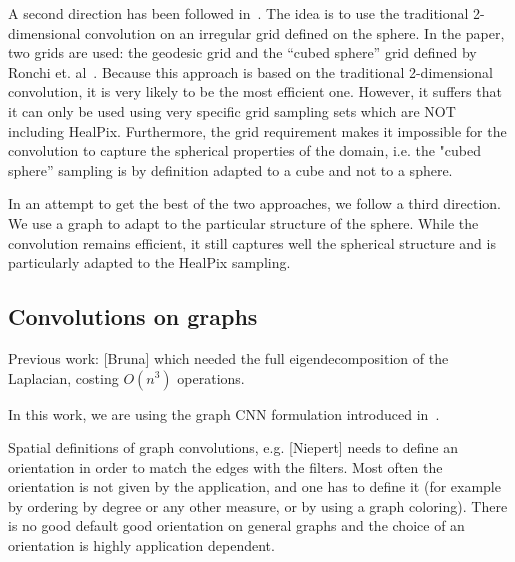\documentclass[preprint,12pt,authoryear]{elsarticle}
\newcommand{\nati}[1]{{\color[rgb]{.1,.6,.1}{#1}}}
\newcommand{\todo}[1]{{\color[rgb]{.6,.1,.6}{#1}}}
\newcommand{\assign}[1]{{\color[rgb]{.8,.5,.8}{Assigned: #1 }}}
\newcommand{\1}{\b{1}}              %
\newcommand{\0}{\b{0}}              %
\begin{document}
A second direction has been followed in~\cite{boomsma2017spherical}. The idea is
to use the traditional 2-dimensional convolution on an irregular grid defined on the
sphere. In the paper, two grids are used: the geodesic grid and the “cubed
sphere” grid defined by Ronchi et. al~\cite{ronchi1996cubed}. Because this
approach is based on the traditional 2-dimensional convolution, it is very likely to be the
most efficient one. However, it suffers that it can only be used using very
specific grid sampling sets which are NOT including HealPix. Furthermore, the
grid requirement makes it impossible for the convolution to capture the
spherical properties of the domain, i.e. the "cubed sphere” sampling is by
definition adapted to a cube and not to a sphere. \nati{Michael: Under some very
specific hypothesis, this second approach is a particular case of our method,
i.e. 1) our method with a stupid sampling, 2) assumption that graph convolution
on a grid == 2d convolution. Do you think we should mention that? I think we
should not.}

In an attempt to get the best of the two approaches, we follow a third
direction. We use a graph to adapt to the particular structure of the sphere.
While the convolution remains efficient, it still captures well the spherical
structure and is particularly adapted to the HealPix sampling.

\subsection{Convolutions on graphs}
\assign{Michaël}

\todo{other approaches? GNNs, Kipf first order approx, message passing}

Previous work: [Bruna] which needed the full eigendecomposition of the Laplacian, costing $O(n^3)$ operations.

In this work, we are using the graph CNN formulation introduced in~\cite{defferrard2016convolutional}.

Spatial definitions of graph convolutions, e.g. [Niepert] needs to define an orientation in order to match the edges with the filters. Most often the orientation is not given by the application, and one has to define it (for example by ordering by degree or any other measure, or by using a graph coloring). There is no good default good orientation on general graphs and the choice of an orientation is highly application dependent.

\todo{Cool to have a global illustration of the network (CNN like)}
\end{document}
